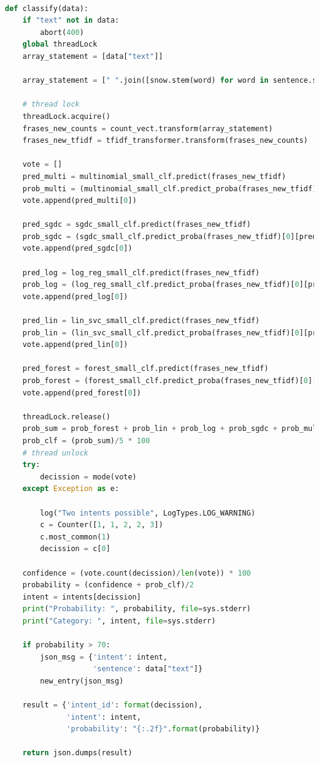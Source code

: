 \begin{lstlisting}[language=Python]

def classify(data):
	if "text" not in data:
		abort(400)
	global threadLock
	array_statement = [data["text"]]

	array_statement = [" ".join([snow.stem(word) for word in sentence.split(" ")]) for sentence in array_statement]
	
	# thread lock
	threadLock.acquire()
	frases_new_counts = count_vect.transform(array_statement)
	frases_new_tfidf = tfidf_transformer.transform(frases_new_counts)
	
	vote = []
	pred_multi = multinomial_small_clf.predict(frases_new_tfidf)
	prob_multi = (multinomial_small_clf.predict_proba(frases_new_tfidf)[0][pred_multi[0]])
	vote.append(pred_multi[0])
	
	pred_sgdc = sgdc_small_clf.predict(frases_new_tfidf)
	prob_sgdc = (sgdc_small_clf.predict_proba(frases_new_tfidf)[0][pred_sgdc[0]])
	vote.append(pred_sgdc[0])
	
	pred_log = log_reg_small_clf.predict(frases_new_tfidf)
	prob_log = (log_reg_small_clf.predict_proba(frases_new_tfidf)[0][pred_log[0]])
	vote.append(pred_log[0])
	
	pred_lin = lin_svc_small_clf.predict(frases_new_tfidf)
	prob_lin = (lin_svc_small_clf.predict_proba(frases_new_tfidf)[0][pred_lin[0]])
	vote.append(pred_lin[0])
	
	pred_forest = forest_small_clf.predict(frases_new_tfidf)
	prob_forest = (forest_small_clf.predict_proba(frases_new_tfidf)[0][pred_forest[0]])
	vote.append(pred_forest[0])
	
	threadLock.release()
	prob_sum = prob_forest + prob_lin + prob_log + prob_sgdc + prob_multi
	prob_clf = (prob_sum)/5 * 100
	# thread unlock
	try:
		decission = mode(vote)
	except Exception as e:
	
		log("Two intents possible", LogTypes.LOG_WARNING)
		c = Counter([1, 1, 2, 2, 3])
		c.most_common(1)
		decission = c[0]
	
	confidence = (vote.count(decission)/len(vote)) * 100
	probability = (confidence + prob_clf)/2
	intent = intents[decission]
	print("Probability: ", probability, file=sys.stderr)
	print("Category: ", intent, file=sys.stderr)
	
	if probability > 70:
		json_msg = {'intent': intent,
					'sentence': data["text"]}
		new_entry(json_msg)
	
	result = {'intent_id': format(decission),
			  'intent': intent,
			  'probability': "{:.2f}".format(probability)}
	
	return json.dumps(result)


\end{lstlisting}

